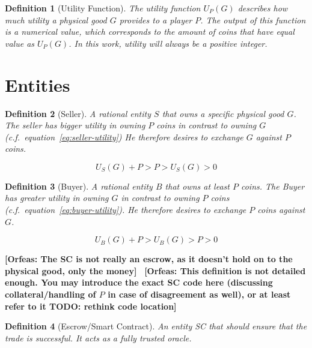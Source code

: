 \documentclass{cacthesis}
\newcommand{\authnote}[3]{{ \footnotesize \textbf{#1[#2: #3]~}}}
\newcommand{\orfnote}[1]{\authnote{\color{blue}}{Orfeas}{#1}}
\newtheorem{definition}{Definition}
\begin{document}
\begin{definition}[Utility Function]
\label{def:utility-function}
The utility function $U_P(G)$ describes how much utility a physical good $G$ provides to a player $P$. The output of this function is a numerical value, which corresponds to the amount of coins that have equal value as $U_P(G)$. In this work, utility will always be a positive integer.
\end{definition}

\section{Entities}

\begin{definition}[Seller]
\label{def:seller}
A rational entity $S$ that owns a specific physical good $G$. The seller
has bigger utility in owning $P$ coins in contrast to owning $G$ (c.f.~equation~\ref{eq:seller-utility}) He therefore desires to exchange $G$ against $P$ coins.
\end{definition}

\begin{equation}
\label{eq:seller-utility}
    U_S(G) + P > P > U_S(G) > 0
\end{equation}

\begin{definition}[Buyer]
\label{def:buyer}
A rational entity $B$ that owns at least $P$ coins. The Buyer has greater utility in owning $G$ in contrast to  owning $P$ coins (c.f.~equation~\ref{eq:buyer-utility}). He therefore desires to exchange $P$ coins against $G$.
\end{definition}

\begin{equation}
\label{eq:buyer-utility}
    U_B(G) + P > U_B(G) > P > 0
\end{equation}

\orfnote{The SC is not really an escrow, as it doesn't hold on to the physical
good, only the money}
\orfnote{This definition is not detailed enough. You may introduce the exact
SC code here (discussing collateral/handling of $P$ in case of
disagreement as well), or at least refer to it TODO: rethink code location}
\begin{definition}[Escrow/Smart Contract]
An entity SC that should ensure that the trade is successful. It acts as a fully trusted oracle.
\end{definition}
\end{document}
